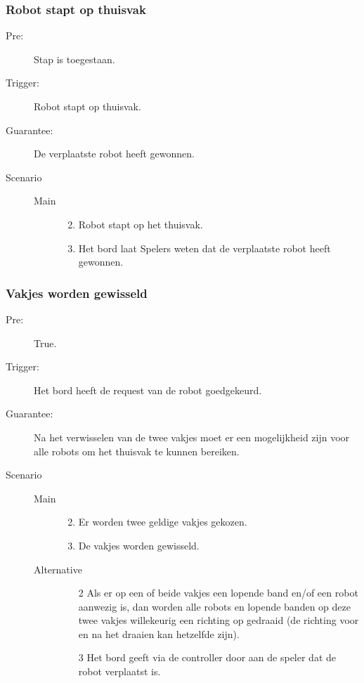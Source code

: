 \subsubsection*{Robot stapt op thuisvak}
\begin{description}
  \item[Pre:] Stap is toegestaan.
  \item[Trigger:] Robot stapt op thuisvak.
  \item[Guarantee:] De verplaatste robot heeft gewonnen.
  \item[Scenario]
    \begin{description}
        \item[]
        \item[Main]
            \begin{enumerate}
              \item[]
              \item Robot stapt op het thuisvak.
	          \item Het bord laat Spelers weten dat de verplaatste robot heeft gewonnen.
            \end{enumerate}
    \end{description}
\end{description}
\newpage
\subsubsection*{Vakjes worden gewisseld}
\begin{description}
  \item[Pre:] True.
  \item[Trigger:] Het bord heeft de request van de robot goedgekeurd.
  \item[Guarantee:] Na het verwisselen van de twee vakjes moet er een mogelijkheid zijn voor alle robots om het thuisvak te kunnen bereiken.
  \item[Scenario]
    \begin{description}
        \item[Main]
            \begin{enumerate}
              \item[]
              \item Er worden twee geldige vakjes gekozen.
              \item De vakjes worden gewisseld.
            \end{enumerate}
        \item[Alternative]
            	\begin{itemize}
			     \item[]
                 \item[2] Als er op een of beide vakjes een lopende band en/of een robot aanwezig is, dan worden alle robots en lopende banden op deze twee vakjes willekeurig een richting op gedraaid (de richting voor en na het draaien kan hetzelfde zijn).
			     \item[3] Het bord geeft via de controller door aan de speler dat de robot verplaatst is.
            	\end{itemize}
    \end{description}
\end{description}
